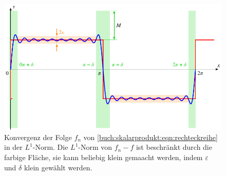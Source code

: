 %
%
%
\begin{figure}
\centering
\includegraphics{chapters/010-skalarprodukt/images/l1konvergenz.pdf}
\caption{Konvergenz der Folge $f_n$ von
\eqref{buch:skalarprodukt:eqn:rechteckreihe} in der $L^1$-Norm.
Die $L^1$-Norm von $f_n-f$ ist beschränkt durch die farbige Fläche,
sie kann beliebig klein gemaacht werden, indem $\varepsilon$ und
$\delta$ klein gewählt werden.
\label{buch:skalarprodukt:funktionenraeume:fig:l1konvergenz}}
\end{figure}
